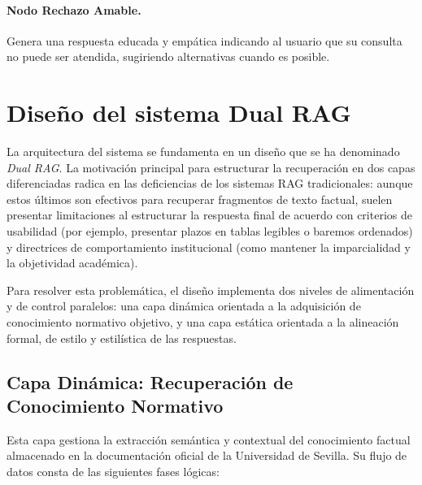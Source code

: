 \documentclass[12pt,a4paper,oneside]{report}
\begin{document}
\paragraph{Nodo Rechazo Amable.} Genera una respuesta educada y empática indicando al usuario que su consulta no puede ser atendida, sugiriendo alternativas cuando es posible.

\section{Diseño del sistema Dual RAG}

La arquitectura del sistema se fundamenta en un diseño que se ha denominado \textit{Dual RAG}. La motivación principal para estructurar la recuperación en dos capas diferenciadas radica en las deficiencias de los sistemas RAG tradicionales: aunque estos últimos son efectivos para recuperar fragmentos de texto factual, suelen presentar limitaciones al estructurar la respuesta final de acuerdo con criterios de usabilidad (por ejemplo, presentar plazos en tablas legibles o baremos ordenados) y directrices de comportamiento institucional (como mantener la imparcialidad y la objetividad académica).

Para resolver esta problemática, el diseño implementa dos niveles de alimentación y de control paralelos: una capa dinámica orientada a la adquisición de conocimiento normativo objetivo, y una capa estática orientada a la alineación formal, de estilo y estilística de las respuestas.

\subsection*{Capa Dinámica: Recuperación de Conocimiento Normativo}

Esta capa gestiona la extracción semántica y contextual del conocimiento factual almacenado en la documentación oficial de la Universidad de Sevilla. Su flujo de datos consta de las siguientes fases lógicas:
\end{document}
